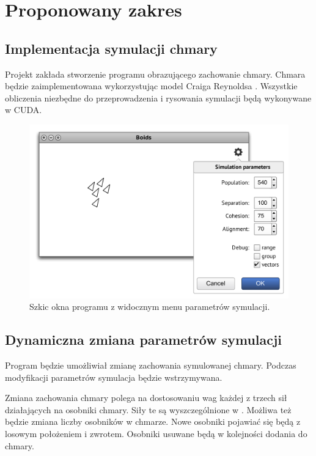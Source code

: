 \section{Proponowany zakres}

\subsection{Implementacja symulacji chmary}
Projekt zakłada stworzenie programu obrazującego zachowanie chmary.
Chmara będzie zaimplementowana wykorzystując model Craiga Reynoldsa
\cite{reynolds}. Wszystkie obliczenia niezbędne do przeprowadzenia i rysowania
symulacji będą wykonywane w CUDA.

\begin{figure}[h]
    \centering
    \includegraphics[scale=0.8]{./figury/wireframe}
    \caption{Szkic okna programu z widocznym menu parametrów symulacji.}
    \label{fig:wireframe}
\end{figure}

\subsection{Dynamiczna zmiana parametrów symulacji}
Program będzie umożliwiał zmianę zachowania symulowanej chmary. Podczas
modyfikacji parametrów symulacja będzie wstrzymywana.

Zmiana zachowania chmary polega na dostosowaniu wag każdej z trzech sił
działających na osobniki chmary. Siły te są wyszczególnione w \cite{reynolds}.
Możliwa też będzie zmiana liczby osobników w chmarze. Nowe osobniki pojawiać się
będą z losowym położeniem i zwrotem. Osobniki usuwane będą w kolejności
dodania do chmary.

